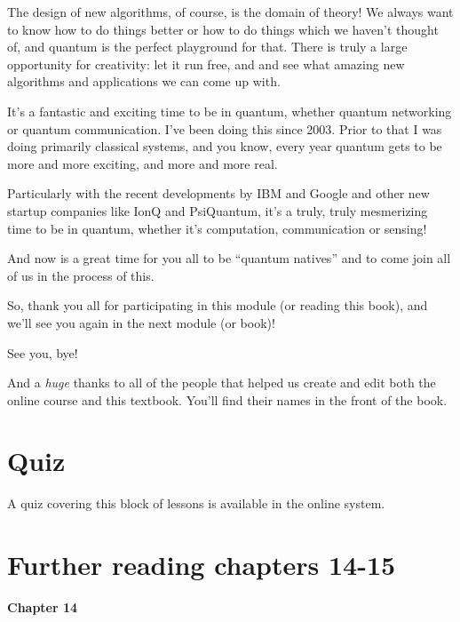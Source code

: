 The design of new algorithms, of course, is the domain of theory! We always want to know how to do things better or how to do things which we haven't thought of, and quantum is the perfect playground for that. There is truly a large opportunity for creativity: let it run free, and and see what amazing new algorithms and applications we can come up with.

\rrr It's a fantastic and exciting time to be in quantum, whether quantum networking or quantum communication. I've been doing this since 2003. Prior to that I was doing primarily classical systems, and you know, every year quantum gets to be more and more exciting, and more and more real.

\mmm Particularly with the recent developments by IBM and Google and other new startup companies like IonQ and PsiQuantum, it's a truly, truly mesmerizing time to be in quantum, whether it's computation, communication or sensing!

\rrr And now is a great time for you all to be ``quantum natives'' and to come join all of us in the process of this.

So, thank you all for participating in this module (or reading this book), and we'll see you again in the next module (or book)!

\mmm See you, bye!

And a \emph{huge} thanks to all of the people that helped us create and edit both the online course and this textbook.  You'll find their names in the front of the book.



\newpage
\section*{Quiz}

A quiz covering this block of lessons is available in the online system.


\section*{Further reading chapters 14-15}

{\bf Chapter 14}

